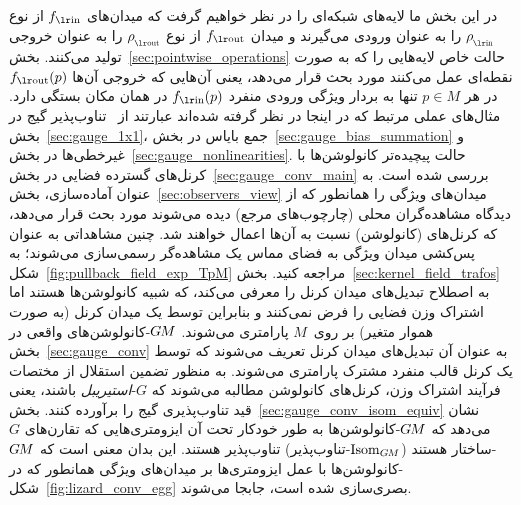 در این بخش ما لایه‌های شبکه‌ای را در نظر خواهیم گرفت که میدان‌های $\fin$ از نوع $\rhoin$ را به عنوان ورودی می‌گیرند و میدان $\fout$ از نوع $\rhoout$ را به عنوان خروجی تولید می‌کنند.
بخش~\ref{sec:pointwise_operations} حالت خاص لایه‌هایی را که به صورت نقطه‌ای عمل می‌کنند مورد بحث قرار می‌دهد، یعنی آن‌هایی که خروجی آن‌ها $\fout(p)$ در هر $p\in M$ تنها به بردار ویژگی ورودی منفرد $\fin(p)$ در همان مکان بستگی دارد.
مثال‌های عملی مرتبط که در اینجا در نظر گرفته شده‌اند عبارتند از \onexonesitfarsi\ تناوب‌پذیر گیج در بخش~\ref{sec:gauge_1x1}، جمع بایاس در بخش~\ref{sec:gauge_bias_summation} و غیرخطی‌ها در بخش~\ref{sec:gauge_nonlinearities}.
حالت پیچیده‌تر کانولوشن‌ها با کرنل‌های گسترده فضایی در بخش~\ref{sec:gauge_conv_main} بررسی شده است.
به عنوان آماده‌سازی، بخش~\ref{sec:observers_view} میدان‌های ویژگی را همانطور که از دیدگاه مشاهده‌گران محلی (چارچوب‌های مرجع) دیده می‌شوند مورد بحث قرار می‌دهد، که کرنل‌های (کانولوشن) نسبت به آن‌ها اعمال خواهند شد.
چنین مشاهداتی به عنوان پس‌کشی میدان ویژگی به فضای مماس یک مشاهده‌گر رسمی‌سازی می‌شوند؛ به شکل~\ref{fig:pullback_field_exp_TpM} مراجعه کنید.
بخش~\ref{sec:kernel_field_trafos} به اصطلاح تبدیل‌های میدان کرنل را معرفی می‌کند، که شبیه کانولوشن‌ها هستند اما اشتراک وزن فضایی را فرض نمی‌کنند و بنابراین توسط یک میدان کرنل (به صورت هموار متغیر) بر روی~$M$ پارامتری می‌شوند.
$G\mkern-1.4muM$-کانولوشن‌های واقعی در بخش~\ref{sec:gauge_conv} به عنوان آن تبدیل‌های میدان کرنل تعریف می‌شوند که توسط یک کرنل قالب منفرد مشترک پارامتری می‌شوند.
به منظور تضمین استقلال از مختصات فرآیند اشتراک وزن، کرنل‌های کانولوشن مطالبه می‌شوند که $G$-\emph{استیریبل} باشند، یعنی قید تناوب‌پذیری گیج را برآورده کنند.
بخش~\ref{sec:gauge_conv_isom_equiv} نشان می‌دهد که $G\mkern-1.4muM$-کانولوشن‌ها به طور خودکار تحت آن ایزومتری‌هایی که تقارن‌های $G$-ساختار هستند ($\operatorname{Isom}_{G\mkern-1.4muM}$-تناوب‌پذیر) تناوب‌پذیر هستند.
این بدان معنی است که $G\mkern-1.4muM$-کانولوشن‌ها با عمل ایزومتری‌ها بر میدان‌های ویژگی همانطور که در شکل~\ref{fig:lizard_conv_egg} بصری‌سازی شده است، جابجا می‌شوند.